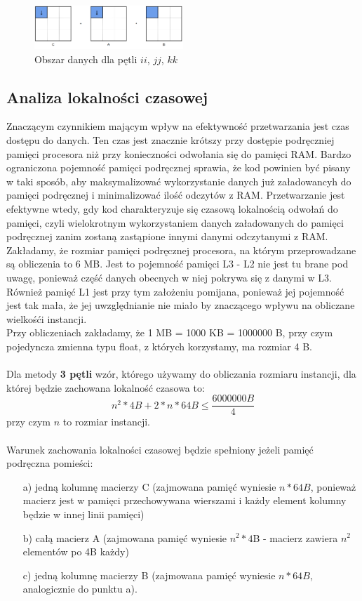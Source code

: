 \documentclass[10pt,a4paper]{article}
\begin{document}
\begin{figure}[h]
	\centering
	\includegraphics[width=0.5\textwidth]{6loops3.png}
	\caption{Obszar danych dla pętli $ii$, $jj$, $kk$}
\end{figure}

\newpage

\subsection{Analiza lokalności czasowej}
Znaczącym czynnikiem mającym wpływ na efektywność przetwarzania jest czas dostępu do
danych. Ten czas jest znacznie krótszy przy dostępie podręczniej pamięci procesora niż
przy konieczności odwołania się do pamięci RAM. Bardzo ograniczona pojemność pamięci
podręcznej sprawia, że kod powinien być pisany w taki sposób, aby maksymalizować
wykorzystanie danych już załadowancyh do pamięci podręcznej i minimalizować ilość
odczytów z RAM. Przetwarzanie jest efektywne wtedy, gdy kod charakteryzuje się
czasową lokalnością odwołań do pamięci, czyli wielokrotnym wykorzystaniem danych załadowanych
do pamięci podręcznej zanim zostaną zastąpione innymi danymi odczytanymi z RAM.\\
Zakładamy, że rozmiar pamięci podręcznej procesora, na którym przeprowadzane są
obliczenia to 6 MB. Jest to pojemność pamięci L3 - L2 nie jest tu brane pod uwagę,
ponieważ część danych obecnych w niej pokrywa się z danymi w L3. Również pamięć L1
jest przy tym założeniu pomijana, ponieważ jej pojemność jest tak mała, że jej uwzględnianie
nie miało by znaczącego wpływu na obliczane wielkośći instancji.\\
Przy obliczeniach zakładamy, że 1 MB = 1000 KB = 1000000 B, przy czym pojedyncza zmienna typu
float, z których korzystamy, ma rozmiar 4 B.\\
\\
Dla metody \textbf{3 pętli} wzór, którego używamy do obliczania rozmiaru instancji, dla której
będzie zachowana lokalność czasowa to:
$$
n^2 * 4B + 2 * n * 64B \leq \frac{6000000B}{4}
$$
przy czym $n$ to rozmiar instancji.\\\\
Warunek zachowania lokalności czasowej będzie spełniony jeżeli pamięć podręczna pomieści:
\begin{enumerate} \itemsep0pt
    \item[a)] jedną kolumnę macierzy C (zajmowana pamięć wyniesie $n * 64B$, ponieważ macierz jest w pamięci 
    przechowywana wierszami i każdy element kolumny będzie w innej linii pamięci)
    \item[b)] całą macierz A (zajmowana pamięć wyniesie $n^2 * 4$B - macierz zawiera $n^2$ elementów po 4B każdy)
    \item[c)] jedną kolumnę macierzy B (zajmowana pamięć wyniesie $n * 64B$, analogicznie do punktu a).
\end{enumerate}
\end{document}

